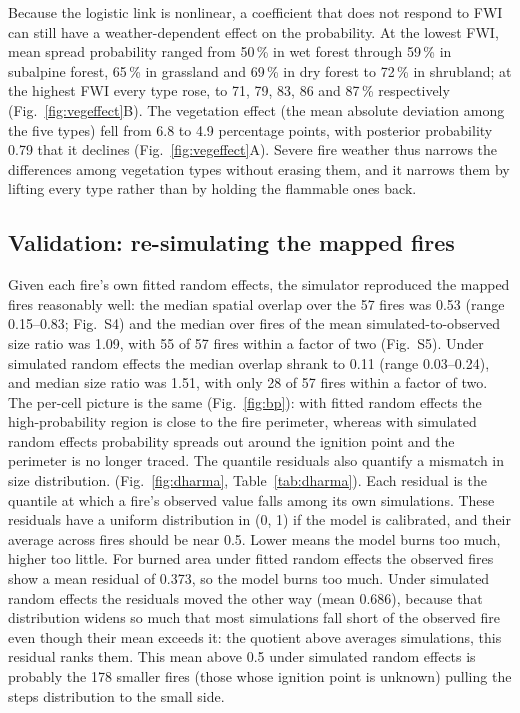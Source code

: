 \documentclass[ResearchPaper,linenum]{CSIRO_LaTeX_Template}
\begin{document}
Because the logistic link is nonlinear, a coefficient that does not respond to FWI can
still have a weather-dependent effect on the probability. At the lowest FWI, mean spread
probability ranged from 50\,\% in wet forest through 59\,\% in subalpine forest, 65\,\%
in grassland and 69\,\% in dry forest to 72\,\% in shrubland; at the highest FWI every
type rose, to 71, 79, 83, 86 and 87\,\% respectively (Fig.~\ref{fig:vegeffect}B). The
vegetation effect (the mean absolute deviation among the five types) fell from 6.8
to 4.9 percentage points, with posterior probability 0.79 that it declines
(Fig.~\ref{fig:vegeffect}A). Severe fire weather thus narrows the differences among
vegetation types without erasing them, and it narrows them by lifting every type rather
than by holding the flammable ones back.

\subsection{Validation: re-simulating the mapped fires}

Given each fire's own fitted random effects, the simulator reproduced the mapped fires
reasonably well: the median spatial overlap over the 57 fires was 0.53 (range
0.15--0.83; Fig.~S4) and the median over fires of the mean simulated-to-observed size
ratio was 1.09, with
55 of 57 fires within a factor of two (Fig.~S5). Under simulated random effects 
the median overlap shrank to 0.11 (range 0.03--0.24), and median size ratio was 1.51, 
with only 28 of 57 fires within a factor of two. The per-cell picture is the same
(Fig.~\ref{fig:bp}): with fitted random effects the high-probability region is close
to the fire perimeter, whereas with simulated random effects probability spreads
out around the ignition point and the perimeter is no longer traced.
The quantile residuals also quantify a mismatch in size distribution. 
(Fig.~\ref{fig:dharma}, Table~\ref{tab:dharma}). Each residual is the quantile at which
a fire's observed value falls among its own simulations. These residuals have a uniform
distribution in (0, 1) if the model is calibrated, and their average across fires should be near 0.5. Lower means
the model burns too much, higher too little. For burned area under fitted random
effects the observed fires show a mean residual of 0.373, so the model burns too much. 
Under simulated random
effects the residuals moved the other way (mean 0.686), because that
distribution widens so much that most simulations fall short of the observed fire even
though their mean exceeds it: the quotient above averages simulations, this residual
ranks them. This mean above 0.5 under simulated random effects is probably the 178 
smaller fires (those whose ignition point is unknown) pulling the steps distribution to
the small side.
\end{document}
